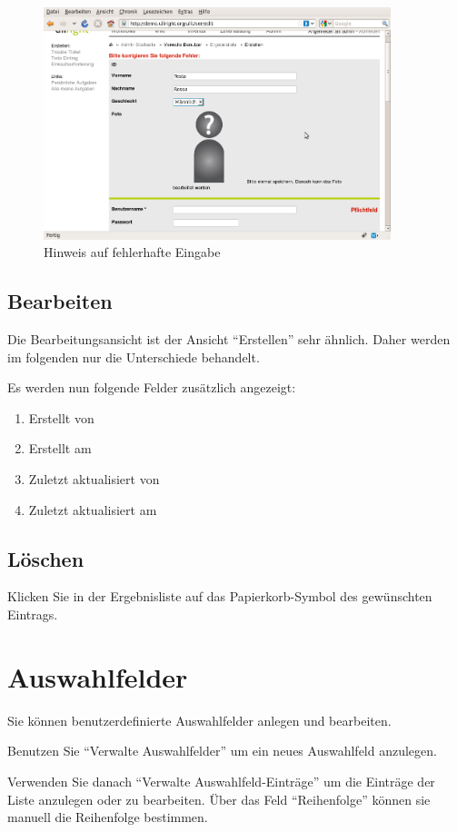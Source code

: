 \documentclass[article, a4paper, oneside, 11pt]{memoir}
\begin{document}
\begin{figure}[htp]
\centering
\includegraphics[width=0.9\textwidth]{figures/ullrightgermanexport-img12.png}
\caption{Hinweis auf fehlerhafte Eingabe}
\label{fig:validation_error}
\end{figure}

\subsection{Bearbeiten}
Die Bearbeitungsansicht ist der Ansicht "`Erstellen"' sehr ähnlich. Daher werden im folgenden nur die Unterschiede behandelt.

Es werden nun folgende Felder zusätzlich angezeigt:

\begin{enumerate}
\item Erstellt von
\item Erstellt am
\item Zuletzt aktualisiert von
\item Zuletzt aktualisiert am
\end{enumerate}
\subsection{Löschen}
Klicken Sie in der Ergebnisliste auf das Papierkorb-Symbol des gewünschten Eintrags.

\section{Auswahlfelder}
Sie können benutzerdefinierte Auswahlfelder anlegen und bearbeiten.

Benutzen Sie "`Verwalte Auswahlfelder"' um ein neues Auswahlfeld anzulegen.

Verwenden Sie danach "`Verwalte Auswahlfeld-Einträge"' um die Einträge der Liste anzulegen oder zu bearbeiten. Über das Feld "`Reihenfolge"' können sie manuell die Reihenfolge bestimmen.
\end{document}
